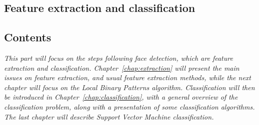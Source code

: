   \begin{titlepage}
    \vspace*{\fill}
      \part{Feature extraction and classification}
    \vspace*{\fill}
  \end{titlepage}

\startcontents[parts]

\chapter*{Contents}

\textit{This part will focus on the steps following face detection, which are feature extraction and classification. Chapter~\ref{chap:extraction} will present the main issues on feature extraction, and usual feature extraction methods, while the next chapter will focus on the Local Binary Patterns algorithm. Classification will then be introduced in Chapter~\ref{chap:classification}, with a general overview of the classification problem, along with a presentation of some classification algorithms. The last chapter will describe Support Vector Machine classification.}

\vspace{\baselineskip}


\pagebreak


\newpage

\pagebreak
\newpage

\newpage


\stopcontents[parts]


